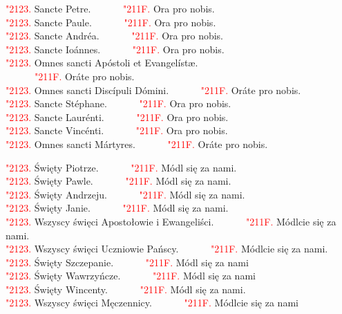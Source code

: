\documentclass[10pt,a5paper]{book}
\newcommand{\kol}{red}
\newcommand{\textjuni}[1]{{\fontspec{Junicode-Regular}#1}}
\newcommand{\vv}{\textcolor{\kol}{\textjuni{\char"2123. }}}
\newcommand{\rrr}{\newline\textcolor{\kol}{\textjuni{~~~~~~\char"211F. }}}
\newcommand{\oremuss}[2]{
	\begin{sloppypar}
		\begin{paracol}{2}
			\setlength{\columnsep}{0em}
			\begin{leftcolumn}
				#1
			\end{leftcolumn}
			\begin{rightcolumn}
				#2
			\end{rightcolumn}
		\end{paracol}
	\end{sloppypar}}
\begin{document}
\oremuss{\vv Sancte Petre. \rrr Ora pro nobis.\\
	\vv Sancte Paule. \rrr Ora pro nobis.\\
	\vv Sancte Andréa. \rrr Ora pro nobis.\\
	\vv Sancte Ioánnes. \rrr Ora pro nobis.\\
	\vv Omnes sancti Apóstoli et Evangelístæ. \\\rrr Oráte pro nobis.\\
	\vv Omnes sancti Discípuli Dómini. \rrr Oráte pro nobis.\\
	\vv Sancte Stéphane. \rrr Ora pro nobis.\\
	\vv Sancte Laurénti. \rrr Ora pro nobis.\\
	\vv Sancte Vincénti. \rrr Ora pro nobis.\\
	\vv Omnes sancti Mártyres. \rrr Oráte pro nobis.}{
	\vv Święty Piotrze. \rrr Módl się za nami.\\
	\vv Święty Pawle. \rrr Módl się za nami.\\
	\vv Święty Andrzeju. \rrr Módl się za nami.\\
	\vv Święty Janie. \rrr Módl się za nami.\\
	\vv Wszyscy święci Apostołowie i Ewangeliści. \rrr Módlcie się za nami.\\
	\vv Wszyscy święci Uczniowie Pańscy. \rrr Módlcie się za nami.\\
	\vv Święty Szczepanie. \rrr Módl się za nami\\
	\vv Święty Wawrzyńcze. \rrr Módl się za nami\\
	\vv Święty Wincenty. \rrr Módl się za nami.\\
	\vv Wszyscy święci Męczennicy. \rrr Módlcie się za nami}
%
\end{document}
